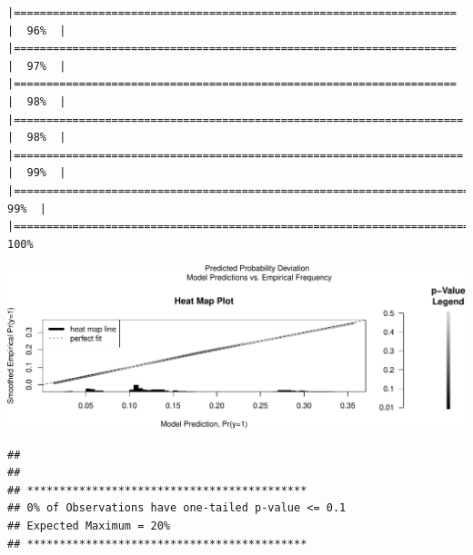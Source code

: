 \documentclass[
  ignorenonframetext,
]{beamer}
\begin{document}
\begin{frame}[fragile]{}
\begin{verbatim}
|====================================================================  |  96%  |                                                                              |====================================================================  |  97%  |                                                                              |====================================================================  |  98%  |                                                                              |===================================================================== |  98%  |                                                                              |===================================================================== |  99%  |                                                                              |======================================================================|  99%  |                                                                              |======================================================================| 100%
\end{verbatim}

\includegraphics{week4_p1_files/figure-beamer/heatmap-1.pdf}

\begin{verbatim}
## 
##  
## ******************************************* 
## 0% of Observations have one-tailed p-value <= 0.1
## Expected Maximum = 20% 
## *******************************************
\end{verbatim}
\end{frame}
\end{document}
